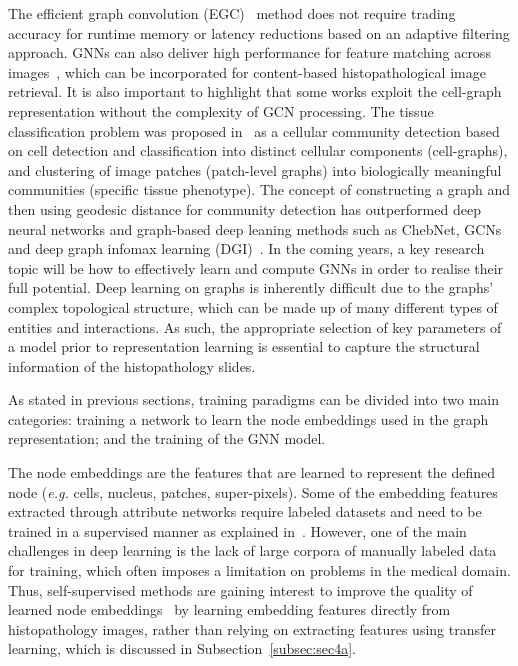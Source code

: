 The efficient graph convolution (EGC)~ method does not require trading accuracy for runtime memory or latency reductions based on an adaptive filtering approach.
GNNs can also deliver high performance for feature matching across images~, which can be incorporated for content-based histopathological image retrieval.
It is also important to highlight that some works exploit the cell-graph representation without the complexity of GCN processing. 
The tissue classification problem was proposed in~ as a cellular community detection based on cell detection and classification into distinct cellular components (cell-graphs), and clustering of image patches (patch-level graphs) into biologically meaningful communities (specific tissue phenotype). 
The concept of constructing a graph and then using geodesic distance for community detection has outperformed deep neural networks and graph-based deep leaning methods such as ChebNet, GCNs and deep graph infomax learning (DGI)~.
In the coming years, a key research topic will be how to effectively learn and compute GNNs in order to realise their full potential. Deep learning on graphs is inherently difficult due to the graphs' complex topological structure, which can be made up of many different types of entities and interactions. 
As such, the appropriate selection of key parameters of a model prior to representation learning is essential to capture the structural information of the histopathology slides.
\vspace{-6pt}

As stated in previous sections, training paradigms can be divided into two main categories: training a network to learn the node embeddings used in the graph representation; and the training of the GNN model.

The node embeddings are the features that are learned to represent the defined node (\textit{e.g.} cells, nucleus, patches, super-pixels). Some of the embedding features extracted through attribute networks require labeled datasets and need to be trained in a supervised manner as explained in~.
However, one of the main challenges in deep learning is the lack of large corpora  of manually labeled data for training, which often imposes a limitation on problems in the medical domain.
Thus, self-supervised methods are gaining interest to improve the quality of learned node embeddings~ by learning embedding features directly from histopathology images, rather than relying on extracting features using transfer learning, which is discussed in Subsection~\ref{subsec:sec4a}.

